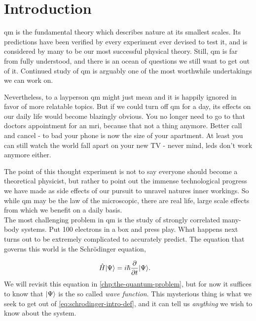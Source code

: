 \documentclass[Thesis.tex]{subfiles}
\begin{document}
\chapter{Introduction}
\label{chp:introduction}

\Gls{qm} is the fundamental theory which describes nature at its
smallest scales. Its predictions have been verified by every experiment ever
devised to test it, and is considered by many to be our most successful physical
theory. Still, \gls{qm} is far from fully understood, and there is an ocean of
questions we still want to get out of it. Continued study of \gls{qm} is arguably one
of the most worthwhile undertakings we can work on.

Nevertheless, to a layperson \acrshort{qm} might just mean  and it
is happily ignored in favor of more relatable topics. But if we could turn off \gls{qm}
for a day, its effects on our daily life would become blazingly obvious. You no
longer need to go to that doctors appointment for an \acrshort{mri}, because that not a
thing anymore. Better call and cancel - to bad your phone is now the size of
your apartment. At least you can still watch the world fall apart on your new TV -
never mind, \acrshort{led}s don't work anymore either.

The point of this thought experiment is not to say everyone should become a
theoretical physicist, but rather to point out the immense technological
progress we have made as side effects of our pursuit to unravel natures inner
workings. So while \acrshort{qm} may be the law of the microscopic, there are
real life, large scale effects from which we benefit on a daily basis.\\

The most challenging problem in \gls{qm} is the study of strongly correlated
many-body systems. Put 100 electrons in a box and press play. What happens next
turns out to be extremely complicated to accurately predict. The equation that
governs this world is the Schrödinger equation,

\begin{align}
  \label{eq:schrodinger-intro-def}
  \hat H| \Psi \rangle &= i\hbar \pdv{}{t}| \Psi \rangle.
\end{align}
We will revisit this equation in \cref{chp:the-quantum-problem}, but for now it
suffices to know that $| \Psi \rangle$ is the so called \emph{wave function}. This
mysterious thing is what we seek to get out of \cref{eq:schrodinger-intro-def},
and it can tell us \emph{anything} we wish to know about the system.
\end{document}

